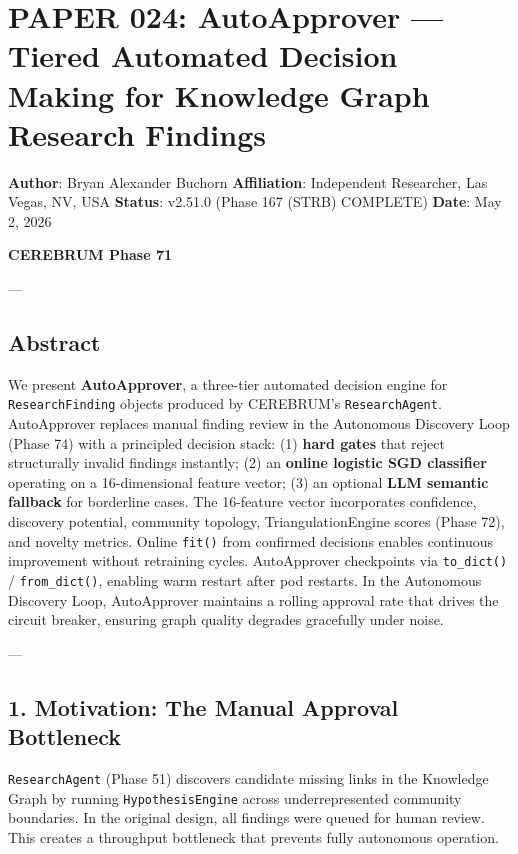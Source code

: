\section{PAPER 024: AutoApprover — Tiered Automated Decision Making for Knowledge Graph Research Findings}

\textbf{Author}: Bryan Alexander Buchorn  
\textbf{Affiliation}: Independent Researcher, Las Vegas, NV, USA  
\textbf{Status}: v2.51.0 (Phase 167 (STRB) COMPLETE)
\textbf{Date}: May 2, 2026

\textbf{CEREBRUM Phase 71}

---

\subsection{Abstract}

We present \textbf{AutoApprover}, a three-tier automated decision engine for \texttt{ResearchFinding} objects produced by CEREBRUM's \texttt{ResearchAgent}. AutoApprover replaces manual finding review in the Autonomous Discovery Loop (Phase 74) with a principled decision stack: (1) \textbf{hard gates} that reject struc\-turally invalid findings instantly; (2) an \textbf{online logistic SGD classifier} operating on a 16-dimensional feature vector; (3) an optional \textbf{LLM semantic fallback} for borderline cases. The 16-feature vector incor\-porates confidence, discovery potential, community topology, Triang\-ulationEngine scores (Phase 72), and novelty metrics. Online \texttt{fit()} from confirmed decisions enables continuous improvement without retraining cycles. AutoApprover checkpoints via \texttt{to\_dict()} / \texttt{from\_dict()}, enabling warm restart after pod restarts. In the Autonomous Discovery Loop, AutoApprover maintains a rolling approval rate that drives the circuit breaker, ensuring graph quality degrades gracefully under noise.

---

\subsection{1. Motivation: The Manual Approval Bottleneck}

\texttt{ResearchAgent} (Phase 51) discovers candidate missing links in the Knowledge Graph by running \texttt{HypothesisEngine} across under\-represented community boundaries. In the original design, all findings were queued for human review. This creates a throughput bottleneck that prevents fully autonomous operation.

